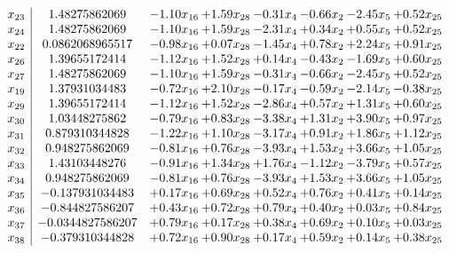 \documentclass[8pt]{article}
\begin{document}
\[\begin{array}{c| c c@{\hskip 2pt} c@{\hskip 2pt} c@{\hskip 2pt} c@{\hskip 2pt} c@{\hskip 2pt} c@{\hskip 2pt} }
 x_{23}   &  1.48275862069 & -1.10 x_{16} & +  1.59 x_{28} & -0.31 x_{4} & -0.66 x_{2} & -2.45 x_{5} & +  0.52 x_{25}\\
 x_{24}   &  1.48275862069 & -1.10 x_{16} & +  1.59 x_{28} & -2.31 x_{4} & +  0.34 x_{2} & +  0.55 x_{5} & +  0.52 x_{25}\\
 x_{22}   &  0.0862068965517 & -0.98 x_{16} & +  0.07 x_{28} & -1.45 x_{4} & +  0.78 x_{2} & +  2.24 x_{5} & +  0.91 x_{25}\\
 x_{26}   &  1.39655172414 & -1.12 x_{16} & +  1.52 x_{28} & +  0.14 x_{4} & -0.43 x_{2} & -1.69 x_{5} & +  0.60 x_{25}\\
 x_{27}   &  1.48275862069 & -1.10 x_{16} & +  1.59 x_{28} & -0.31 x_{4} & -0.66 x_{2} & -2.45 x_{5} & +  0.52 x_{25}\\
 x_{19}   &  1.37931034483 & -0.72 x_{16} & +  2.10 x_{28} & -0.17 x_{4} & -0.59 x_{2} & -2.14 x_{5} & -0.38 x_{25}\\
 x_{29}   &  1.39655172414 & -1.12 x_{16} & +  1.52 x_{28} & -2.86 x_{4} & +  0.57 x_{2} & +  1.31 x_{5} & +  0.60 x_{25}\\
 x_{30}   &  1.03448275862 & -0.79 x_{16} & +  0.83 x_{28} & -3.38 x_{4} & +  1.31 x_{2} & +  3.90 x_{5} & +  0.97 x_{25}\\
 x_{31}   &  0.879310344828 & -1.22 x_{16} & +  1.10 x_{28} & -3.17 x_{4} & +  0.91 x_{2} & +  1.86 x_{5} & +  1.12 x_{25}\\
 x_{32}   &  0.948275862069 & -0.81 x_{16} & +  0.76 x_{28} & -3.93 x_{4} & +  1.53 x_{2} & +  3.66 x_{5} & +  1.05 x_{25}\\
 x_{33}   &  1.43103448276 & -0.91 x_{16} & +  1.34 x_{28} & +  1.76 x_{4} & -1.12 x_{2} & -3.79 x_{5} & +  0.57 x_{25}\\
 x_{34}   &  0.948275862069 & -0.81 x_{16} & +  0.76 x_{28} & -3.93 x_{4} & +  1.53 x_{2} & +  3.66 x_{5} & +  1.05 x_{25}\\
 x_{35}   &  -0.137931034483 & +  0.17 x_{16} & +  0.69 x_{28} & +  0.52 x_{4} & +  0.76 x_{2} & +  0.41 x_{5} & +  0.14 x_{25}\\
 x_{36}   &  -0.844827586207 & +  0.43 x_{16} & +  0.72 x_{28} & +  0.79 x_{4} & +  0.40 x_{2} & +  0.03 x_{5} & +  0.84 x_{25}\\
 x_{37}   &  -0.0344827586207 & +  0.79 x_{16} & +  0.17 x_{28} & +  0.38 x_{4} & +  0.69 x_{2} & +  0.10 x_{5} & +  0.03 x_{25}\\
 x_{38}   &  -0.379310344828 & +  0.72 x_{16} & +  0.90 x_{28} & +  0.17 x_{4} & +  0.59 x_{2} & +  0.14 x_{5} & +  0.38 x_{25}\\

\end{array}\]
\end{document}
